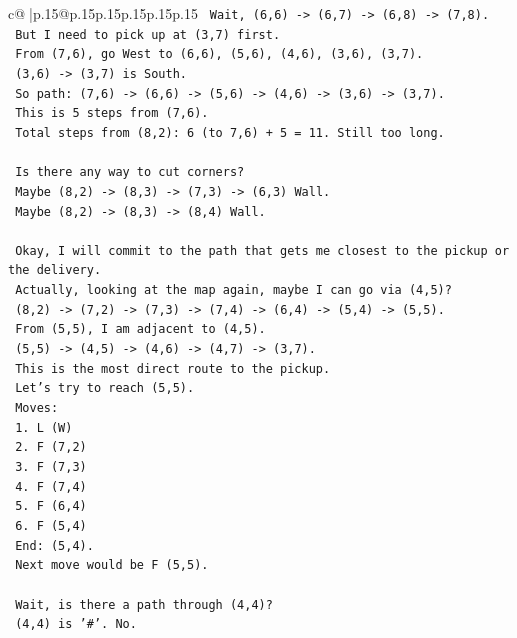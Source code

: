 \documentclass{article}
\begin{document}
{\begin{supertabular}{c@{$\;$}|p{.15\linewidth}@{}p{.15\linewidth}p{.15\linewidth}p{.15\linewidth}p{.15\linewidth}p{.15\linewidth}}
{{{\texttt{   Wait, (6,6) {-}> (6,7) {-}> (6,8) {-}> (7,8).} \\
\texttt{   But I need to pick up at (3,7) first.} \\
\texttt{   From (7,6), go West to (6,6), (5,6), (4,6), (3,6), (3,7).} \\
\texttt{   (3,6) {-}> (3,7) is South.} \\
\texttt{   So path: (7,6) {-}> (6,6) {-}> (5,6) {-}> (4,6) {-}> (3,6) {-}> (3,7).} \\
\texttt{   This is 5 steps from (7,6).} \\
\texttt{   Total steps from (8,2): 6 (to 7,6) + 5 = 11. Still too long.} \\
\\ 
\texttt{   Is there any way to cut corners?} \\
\texttt{   Maybe (8,2) {-}> (8,3) {-}> (7,3) {-}> (6,3) Wall.} \\
\texttt{   Maybe (8,2) {-}> (8,3) {-}> (8,4) Wall.} \\
\\ 
\texttt{   Okay, I will commit to the path that gets me closest to the pickup or the delivery.} \\
\texttt{   Actually, looking at the map again, maybe I can go via (4,5)?} \\
\texttt{   (8,2) {-}> (7,2) {-}> (7,3) {-}> (7,4) {-}> (6,4) {-}> (5,4) {-}> (5,5).} \\
\texttt{   From (5,5), I am adjacent to (4,5).} \\
\texttt{   (5,5) {-}> (4,5) {-}> (4,6) {-}> (4,7) {-}> (3,7).} \\
\texttt{   This is the most direct route to the pickup.} \\
\texttt{   Let's try to reach (5,5).} \\
\texttt{   Moves:} \\
\texttt{   1. L (W)} \\
\texttt{   2. F (7,2)} \\
\texttt{   3. F (7,3)} \\
\texttt{   4. F (7,4)} \\
\texttt{   5. F (6,4)} \\
\texttt{   6. F (5,4)} \\
\texttt{   End: (5,4).} \\
\texttt{   Next move would be F (5,5).} \\
\\ 
\texttt{   Wait, is there a path through (4,4)?} \\
\texttt{   (4,4) is '\#'. No.} \\
}}}
\end{supertabular}}
\end{document}
